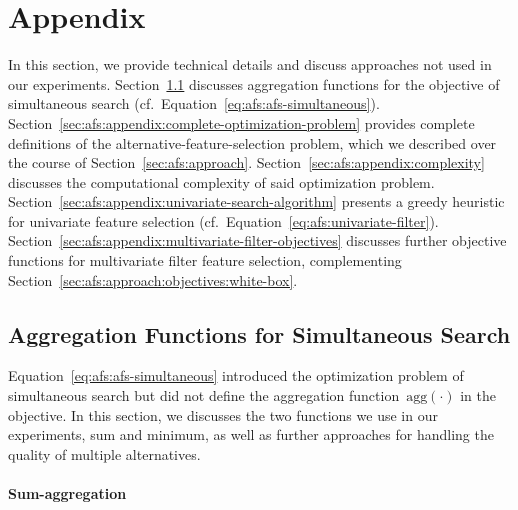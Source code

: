 \documentclass{article}
\theoremstyle{definition}
\begin{document}
\section{Appendix}
\label{sec:afs:appendix}

In this section, we provide technical details and discuss approaches not used in our experiments.
Section~\ref{sec:afs:appendix:simultaneous-objective-aggregation} discusses aggregation functions for the objective of simultaneous search (cf.~Equation~\ref{eq:afs:afs-simultaneous}).
Section~\ref{sec:afs:appendix:complete-optimization-problem} provides complete definitions of the alternative-feature-selection problem, which we described over the course of Section~\ref{sec:afs:approach}.
Section~\ref{sec:afs:appendix:complexity} discusses the computational complexity of said optimization problem.
Section~\ref{sec:afs:appendix:univariate-search-algorithm} presents a greedy heuristic for univariate feature selection (cf.~Equation~\ref{eq:afs:univariate-filter}).
Section~\ref{sec:afs:appendix:multivariate-filter-objectives} discusses further objective functions for multivariate filter feature selection, complementing Section~\ref{sec:afs:approach:objectives:white-box}.

\subsection{Aggregation Functions for Simultaneous Search}
\label{sec:afs:appendix:simultaneous-objective-aggregation}

Equation~\ref{eq:afs:afs-simultaneous} introduced the optimization problem of simultaneous search but did not define the aggregation function~$\text{agg}(\cdot)$ in the objective.
In this section, we discusses the two functions we use in our experiments, sum and minimum, as well as further approaches for handling the quality of multiple alternatives.

\paragraph{Sum-aggregation}
\end{document}
